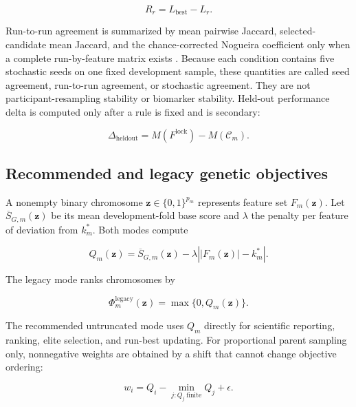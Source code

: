 \begin{equation}
R_r=L_{\mathrm{best}}-L_r.
\label{eq:regret}
\end{equation}

Run-to-run agreement is summarized by mean pairwise Jaccard, selected-candidate mean Jaccard, and the chance-corrected Nogueira coefficient only when a complete run-by-feature matrix exists \citep{ref36}. Because each condition contains five stochastic seeds on one fixed development sample, these quantities are called seed agreement, run-to-run agreement, or stochastic agreement. They are not participant-resampling stability or biomarker stability. Held-out performance delta is computed only after a rule is fixed and is secondary:

\begin{equation}
\Delta_{\mathrm{heldout}}=M(F^{\mathrm{lock}})-M(\mathcal C_m).
\label{eq:heldout-delta}
\end{equation}

\subsection{Recommended and legacy genetic objectives}

A nonempty binary chromosome \(\mathbf z\in\{0,1\}^{p_m}\) represents feature set \(F_m(\mathbf z)\). Let \(\overline S_{G,m}(\mathbf z)\) be its mean development-fold base score and \(\lambda\) the penalty per feature of deviation from \(k_m^{\ast}\). Both modes compute

\begin{equation}
Q_m(\mathbf z)=\overline S_{G,m}(\mathbf z)-\lambda\left||F_m(\mathbf z)|-k_m^{\ast}\right|.
\label{eq:raw-objective}
\end{equation}

The legacy mode ranks chromosomes by

\begin{equation}
\Phi_m^{\mathrm{legacy}}(\mathbf z)=\max\{0,Q_m(\mathbf z)\}.
\label{eq:legacy-fitness}
\end{equation}

The recommended untruncated mode uses \(Q_m\) directly for scientific reporting, ranking, elite selection, and run-best updating. For proportional parent sampling only, nonnegative weights are obtained by a shift that cannot change objective ordering:

\begin{equation}
w_i=Q_i-\min_{j:Q_j\ \mathrm{finite}}Q_j+\epsilon.
\label{eq:shifted-weight}
\end{equation}

